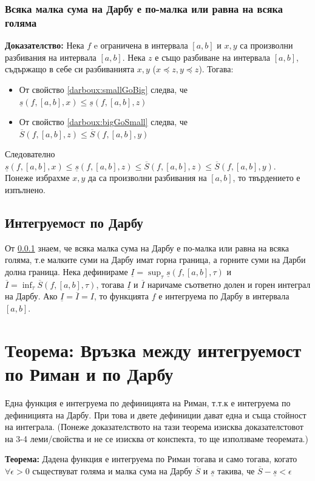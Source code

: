 \documentclass[fleqn,12pt]{article}
\begin{document}
\subsubsection{Всяка малка сума на Дарбу е по-малка или равна на всяка голяма} \label{darboux:smallLtBig}
\textbf{Доказателство: }
Нека $f$ e ограничена в интервала $[a,b]$ и $x,y$ са произволни разбивания на интервала $[a,b]$. Нека $z$ е също разбиване на интервала $[a,b]$,
съдържащо в себе си разбиванията $x,y$ ($x \preceq z, y \preceq z$). Тогава:
\begin{itemize}
    \item От свойство \ref{darboux:smallGoBig} следва, че $\underline{s}(f,[a,b],x) \leq \underline{s}(f,[a,b],z)$
    \item От свойство \ref{darboux:bigGoSmall} следва, че $\overline{S}(f,[a,b],z) \leq \overline{S}(f,[a,b],y)$
\end{itemize}

Следователно $\underline{s}(f,[a,b],x) \leq \underline{s}(f,[a,b],z) \leq \overline{S}(f,[a,b],z) \leq \overline{S}(f,[a,b],y)$.\\
Понеже избрахме $x,y$ да са произволни разбивания на $[a,b]$, то твърдението е изпълнено. 

\subsection{Интегруемост по Дарбу}
От \ref{darboux:smallLtBig} знаем, че всяка малка сума на Дарбу е по-малка или равна на всяка голяма, т.е малките суми на Дарбу имат горна граница, а горните суми на Дарби долна граница.
Нека дефинираме $\underline{I}=\sup_\tau \underline{s}(f,[a,b],\tau)$ и $\overline{I}=\inf_\tau \overline{S}(f,[a,b],\tau)$,
тогава $\underline{I}$ и  $\overline{I}$ наричаме съответно долен и горен интеграл на Дарбу. Ако $\underline{I}=\overline{I}=I$, то функцията $f$ е интегруема по Дарбу в интервала $[a,b]$.

\section{Теорема: Връзка между интегруемост по Риман и по Дарбу}
Една функция е интегруема по дефиницията на Риман, т.т.к е интегруема по дефиницията на Дарбу. При това и двете дефиниции дават една и съща стойност на интеграла.
(Понеже доказателството на тази теорема изисква доказателстовот на 3-4 леми/свойства и не се изисква от конспекта, то ще използваме теоремата.)

\textbf{Теорема:} Дадена функция е интегруема по Риман тогава и само тогава, когато $\forall\epsilon > 0$ съществуват голяма и малка сума на Дарбу $\overline{S}$ и $\underline{s}$ такива, че $\overline{S}-\underline{s} < \epsilon$
\end{document}
